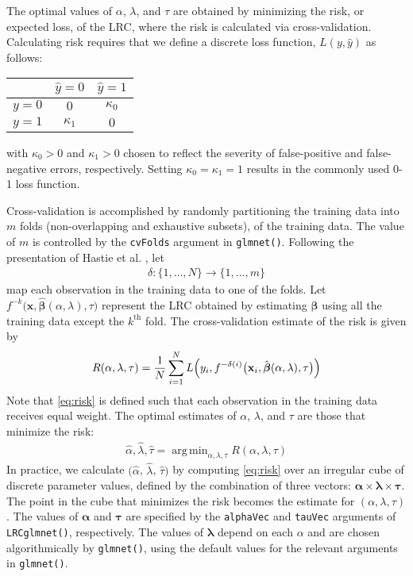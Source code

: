 \documentclass{article}
\DeclareMathOperator*{\argmin}{arg\,min}
\begin{document}
The optimal values of $\alpha$, $\lambda$, and $\tau$ are obtained by minimizing the risk, or expected loss, of 
the LRC, where the risk is calculated via cross-validation.  Calculating risk requires that we define a discrete 
loss function, $L(y,\hat{y})$ as follows:
\begin{table}[H]
\begin{center}
\begin{tabular}{c|cc}
& $\hat{y} = 0$ & $\hat{y} = 1$ \\
\hline
$y = 0$ & $0$ & $\kappa_0$ \\
$y = 1$ & $\kappa_1$ & $0$ \\
\end{tabular}
\end{center}
\end{table}
\noindent with $\kappa_0 > 0$ and $\kappa_1 > 0$ chosen to reflect the severity of false-positive and 
false-negative errors, respectively.  Setting $\kappa_0 = \kappa_1 = 1$ results in the commonly used 0-1 loss
function.

Cross-validation is accomplished by randomly partitioning the training data into $m$ folds (non-overlapping and
exhaustive subsets), of the training data. The value of $m$ is controlled by the {\tt cvFolds} argument in 
{\tt glmnet()}. Following the presentation of Hastie et al. \cite{Hastie}, let
\begin{align}
\delta:\{1,\ldots,N\} \rightarrow \{1, \ldots, m\}
\end{align}
\noindent map each observation in the training data to one of the folds.
Let $f^{-k} \bigl( \mathbf{x},\hat{\boldsymbol{\beta}}(\alpha,\lambda),\tau \bigr)$ represent the LRC obtained by estimating 
$\boldsymbol{\beta}$ using all the training data except the $k^{\text{th}}$ fold. The 
cross-validation estimate of the risk is given by
\begin{align}
\label{eq:risk}
R(\alpha,\lambda,\tau) = \frac{1}{N}\sum_{i=1}^N L \Bigl(y_i, f^{-\delta(i)} \bigl(\mathbf{x}_i,
\hat{\boldsymbol{\beta}}(\alpha,\lambda),\tau \bigr) \Bigr)
\end{align}
\noindent Note that \eqref{eq:risk} is defined such that each observation in the training data receives 
equal weight. The optimal estimates of $\alpha$, $\lambda$, and $\tau$ are those that minimize the risk:
\begin{align}
\hat\alpha,\hat\lambda,\hat\tau = \argmin_{\alpha,\lambda,\tau} R(\alpha,\lambda,\tau)
\end{align}
In practice, we calculate $(\hat\alpha$, $\hat\lambda$, $\hat\tau)$ by computing \eqref{eq:risk} over an irregular
cube of discrete parameter values, defined by the combination of three vectors:  
$\boldsymbol\alpha \times \boldsymbol\lambda \times \boldsymbol\tau$.
The point in the cube that minimizes the risk becomes the estimate for $(\alpha, \lambda, \tau)$.
The values of $\boldsymbol\alpha$ and $\boldsymbol\tau$ are specified by the {\tt alphaVec} and {\tt tauVec} arguments
of {\tt LRCglmnet()}, respectively.  The values of $\boldsymbol\lambda$ depend on each $\alpha$ and are chosen algorithmically
by {\tt glmnet()}, using the default values for the relevant arguments in {\tt glmnet()}.
\end{document}

